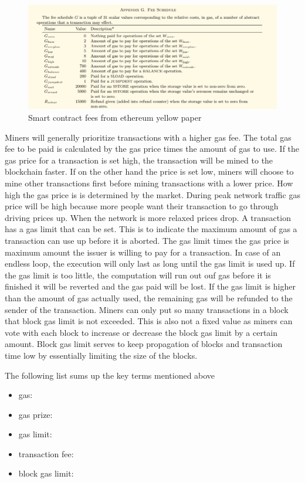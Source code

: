 \begin{figure}
  \label{fig:smart_contract_fees}
  \includegraphics{Talk7/img/smart_contracts/gas-fees.png}
  \caption{Smart contract fees from ethereum yellow paper}
  
\end{figure}

Miners will generally prioritize transactions with a higher gas fee. The total gas fee to be paid is calculated by the gas price times the amount of gas to use. If the gas price for a transaction is set high, the transaction will be mined to the blockchain faster. If on the other hand the price is set low, miners will choose to mine other transactions first
before mining transactions with a lower price. How high the gas price is is determined by the market. During peak network traffic gas price will be high because more people want their transaction to go through driving prices up. When the network is more relaxed prices drop.
A transaction has a gas limit that can be set. This is to indicate the maximum amount of gas a transaction can use up before it is aborted. The gas limit times the gas price is maximum amount the issuer is willing to pay for a transaction. In case of an endless loop, the execution will only last as long until the gas limit is used up.
If the gas limit is too little, the computation will run out ouf gas before it is finished it will be reverted and the gas paid will be lost. If the gas limit is higher than the amount of gas actually used, the remaining gas will be refunded to the sender of the transaction. 
Miners can only put so many transactions in a block that block gas limit is not exceeded. This is also not a fixed value as miners can vote with each block to increase or decrease the block gas limit by a certain amount. Block gas limit serves to keep propagation of blocks and transaction time low by essentially limiting the size of the blocks.

The following list sums up the key terms mentioned above
\begin{itemize}
  \item {gas:}
  \item {gas prize:}
  \item {gas limit:}
  \item {transaction fee:}
  \item {block gas limit:}
  
\end{itemize}

